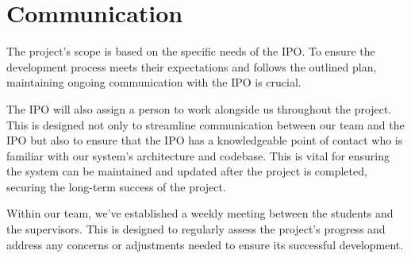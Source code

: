 \documentclass[a4paper,11pt]{article}
\begin{document}
\section{Communication}
The project's scope is based on the specific needs of the IPO. To ensure the development process meets their expectations and follows the outlined plan, maintaining ongoing communication with the IPO is crucial.

The IPO will also assign a person to work alongside us throughout the project. This is designed not only to streamline communication between our team and the IPO but also to ensure that the IPO has a knowledgeable point of contact who is familiar with our system's architecture and codebase. This is vital for ensuring the system can be maintained and updated after the project is completed, securing the long-term success of the project.

Within our team, we've established a weekly meeting between the students and the supervisors. This is designed to regularly assess the project's progress and address any concerns or adjustments needed to ensure its successful development.

\printbibliography[heading=bibintoc]
\end{document}
